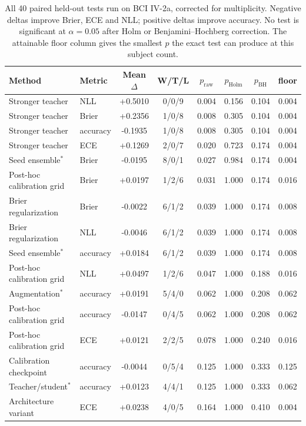 \begin{table}[t]
\centering
\caption{All 40 paired held-out tests run on BCI IV-2a, corrected for multiplicity. Negative deltas improve Brier, ECE and NLL; positive deltas improve accuracy. No test is significant at $\alpha=0.05$ after Holm or Benjamini--Hochberg correction. The attainable floor column gives the smallest $p$ the exact test can produce at this subject count.}
\label{tab:multiplicity}
\begin{tabular}{llcccccc}
\toprule
Method & Metric & Mean $\Delta$ & W/T/L & $p_{\mathrm{raw}}$ & $p_{\mathrm{Holm}}$ & $p_{\mathrm{BH}}$ & floor \\
\midrule
Stronger teacher & NLL & +0.5010 & 0/0/9 & 0.004 & 0.156 & 0.104 & 0.004 \\
Stronger teacher & Brier & +0.2356 & 1/0/8 & 0.008 & 0.305 & 0.104 & 0.004 \\
Stronger teacher & accuracy & -0.1935 & 1/0/8 & 0.008 & 0.305 & 0.104 & 0.004 \\
Stronger teacher & ECE & +0.1269 & 2/0/7 & 0.020 & 0.723 & 0.174 & 0.004 \\
Seed ensemble$^{*}$ & Brier & -0.0195 & 8/0/1 & 0.027 & 0.984 & 0.174 & 0.004 \\
Post-hoc calibration grid & Brier & +0.0197 & 1/2/6 & 0.031 & 1.000 & 0.174 & 0.016 \\
Brier regularization & Brier & -0.0022 & 6/1/2 & 0.039 & 1.000 & 0.174 & 0.008 \\
Brier regularization & NLL & -0.0046 & 6/1/2 & 0.039 & 1.000 & 0.174 & 0.008 \\
Seed ensemble$^{*}$ & accuracy & +0.0184 & 6/1/2 & 0.039 & 1.000 & 0.174 & 0.008 \\
Post-hoc calibration grid & NLL & +0.0497 & 1/2/6 & 0.047 & 1.000 & 0.188 & 0.016 \\
Augmentation$^{*}$ & accuracy & +0.0191 & 5/4/0 & 0.062 & 1.000 & 0.208 & 0.062 \\
Post-hoc calibration grid & accuracy & -0.0147 & 0/4/5 & 0.062 & 1.000 & 0.208 & 0.062 \\
Post-hoc calibration grid & ECE & +0.0121 & 2/2/5 & 0.078 & 1.000 & 0.240 & 0.016 \\
Calibration checkpoint & accuracy & -0.0044 & 0/5/4 & 0.125 & 1.000 & 0.333 & 0.125 \\
Teacher/student$^{*}$ & accuracy & +0.0123 & 4/4/1 & 0.125 & 1.000 & 0.333 & 0.062 \\
Architecture variant & ECE & +0.0238 & 4/0/5 & 0.164 & 1.000 & 0.410 & 0.004 \\

\end{tabular}
\end{table}
